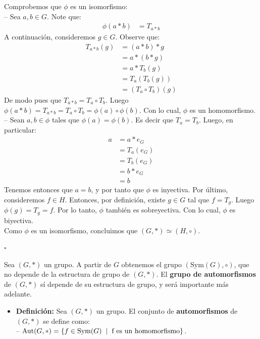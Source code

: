 \documentclass[10 pt]{article}
\begin{document}
\Large{Comprobemos que $\phi$ es un isomorfismo: \\

-- Sea $a,b \in G$. Note que:
\begin{align*}
    \phi(a*b)&=T_{a*b}
\end{align*}
A continuación, consideremos $g \in G$. Observe que:
\begin{align*}
    T_{a*b}(g)&=(a*b)*g \\
    &=a*(b*g) \\
    &=a*T_b(g) \\
    &=T_a(T_b(g)) \\
    &=(T_a \circ T_b)(g)
\end{align*}
De modo pues que $T_{a*b}=T_a \circ T_b$. Luego $\phi(a*b)=T_{a*b}=T_a \circ T_b=\phi(a) \circ \phi(b)$. Con lo cual, $\phi$ es un homomorfismo. \\

-- Sean $a,b \in \phi$ tales que $\phi(a)=\phi(b)$. Es decir que $T_a=T_b$. Luego, en particular:
\begin{align*}
    a&=a*e_G \\
    &=T_a(e_G) \\
    &=T_b(e_G) \\
    &=b*e_G \\
    &=b
\end{align*}
Tenemos entonces que $a=b$, y por tanto que $\phi$ es inyectiva. Por último, consideremos $f \in H$. Entonces, por definición, existe $g \in G$ tal que $f=T_g$. Luego $\phi(g)=T_g=f$. Por lo tanto, $\phi$ también es sobreyectiva. Con lo cual, $\phi$ es biyectiva. \\

Como $\phi$ es un isomorfismo, concluimos que $(G,*) \simeq (H,\circ)$.} \\

\begin{flushright}
    $\square$
\end{flushright}

\Large{Sea $(G,*)$ un grupo. A partir de $G$ obtenemos el grupo $(\text{Sym}(G),\circ)$, que no depende de la estructura de grupo de $(G,*)$. El \textbf{grupo de automorfismos} de $(G,*)$ sí depende de su estructura de grupo, y será importante más adelante.} \\

\begin{itemize}
    \item \Large{\textbf{Definición:} Sea $(G,*)$ un grupo. El conjunto de \textbf{automorfismos} de $(G,*)$ se define como: \\

    -- $\text{Aut}(G,*)=\{f \in \text{Sym}(G) \hspace{0.2 cm}|\hspace{0.2 cm}\text{f es un homomorfismo}\}$.} \\
\end{itemize}
\end{document}
